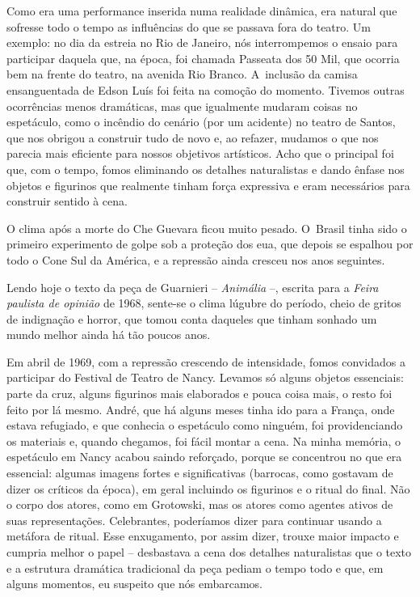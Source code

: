Como era uma performance inserida numa realidade dinâmica,
era natural que sofresse todo o tempo as influências do que se passava
fora do teatro. Um exemplo: no dia da estreia no Rio de Janeiro, nós
interrompemos o ensaio para participar daquela que, na época, foi chamada
Passeata dos 50 Mil, que ocorria bem na frente do teatro, na avenida
Rio Branco. A~inclusão da camisa ensanguentada de Edson Luís foi feita
na comoção do momento. Tivemos outras ocorrências menos dramáticas, mas
que igualmente mudaram coisas no espetáculo, como o incêndio do cenário
(por um acidente) no teatro de Santos, que nos obrigou a construir tudo de
novo e, ao refazer, mudamos o que nos parecia mais eficiente para
nossos objetivos artísticos. Acho que o principal foi que, com o tempo,
fomos eliminando os detalhes naturalistas e dando ênfase nos objetos e
figurinos que realmente tinham força expressiva e eram necessários para
construir sentido à cena.

O clima após a morte do Che Guevara ficou muito pesado. O~Brasil tinha
sido o primeiro experimento de golpe sob a proteção dos {\sc eua}, que depois
se espalhou por todo o Cone Sul da América, e a repressão ainda cresceu
nos anos seguintes.

Lendo hoje o texto da peça de Guarnieri -- {\it Animália} --, escrita para a
{\it Feira paulista de opinião} de 1968, sente-se o clima lúgubre
do período, cheio de gritos de indignação e horror, que tomou conta
daqueles que tinham sonhado um mundo melhor ainda há tão poucos anos.

Em abril de 1969, com a repressão crescendo de intensidade, fomos convidados a
participar do Festival de Teatro de Nancy.
Levamos só alguns objetos essenciais: parte da cruz, alguns
figurinos mais elaborados e pouca coisa mais, o resto foi feito por lá
mesmo. André, que há alguns meses tinha ido para a França, onde estava
refugiado, e que conhecia o espetáculo como ninguém, foi providenciando
os materiais e, quando chegamos, foi fácil montar a cena. Na minha memória,
o espetáculo em Nancy acabou saindo reforçado, porque se concentrou no
que era essencial: algumas imagens fortes e significativas (barrocas,
como gostavam de dizer os críticos da época), em geral incluindo os
figurinos e o ritual do final. Não o corpo dos atores, como em Grotowski,
mas os atores como agentes ativos de suas representações. Celebrantes,
poderíamos dizer para continuar usando a metáfora de ritual. Esse
enxugamento, por assim dizer, trouxe maior impacto e cumpria melhor o papel --
desbastava a cena dos detalhes naturalistas que o texto e a
estrutura dramática tradicional da peça pediam o tempo todo e que, em
alguns momentos, eu suspeito que nós embarcamos.

